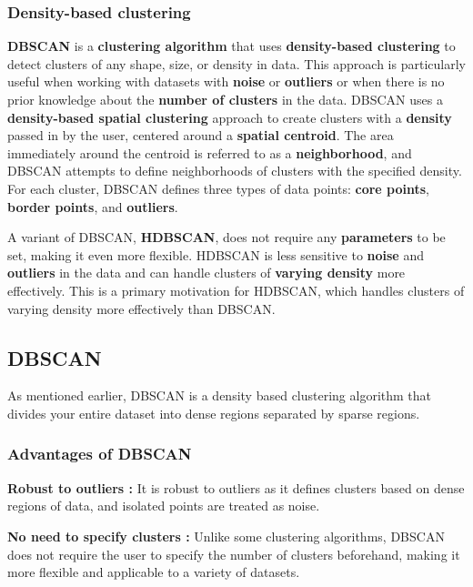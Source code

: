 \subsubsection{Density-based clustering}
\textbf{DBSCAN} is a \textbf{clustering algorithm} that uses \textbf{density-based clustering} to detect clusters of any shape, size, or density in data. This approach is particularly useful when working with datasets with \textbf{noise} or \textbf{outliers} or when there is no prior knowledge about the \textbf{number of clusters} in the data. DBSCAN uses a \textbf{density-based spatial clustering} approach to create clusters with a \textbf{density} passed in by the user, centered around a \textbf{spatial centroid}. The area immediately around the centroid is referred to as a \textbf{neighborhood}, and DBSCAN attempts to define neighborhoods of clusters with the specified density. For each cluster, DBSCAN defines three types of data points: \textbf{core points}, \textbf{border points}, and \textbf{outliers}.

A variant of DBSCAN, \textbf{HDBSCAN}, does not require any \textbf{parameters} to be set, making it even more flexible. HDBSCAN is less sensitive to \textbf{noise} and \textbf{outliers} in the data and can handle clusters of \textbf{varying density} more effectively. This is a primary motivation for HDBSCAN, which handles clusters of varying density more effectively than DBSCAN.

\subsection{DBSCAN}

\par As mentioned earlier, DBSCAN is a density based clustering algorithm that divides your entire dataset into dense regions separated by sparse regions.

\subsubsection{Advantages of DBSCAN}

\par \textbf{Robust to outliers :} It is robust to outliers as it defines clusters based on dense regions of data, and isolated points are treated as noise.

\par \textbf{No need to specify clusters : } Unlike some clustering algorithms, DBSCAN does not require the user to specify the number of clusters beforehand, making it more flexible and applicable to a variety of datasets.

